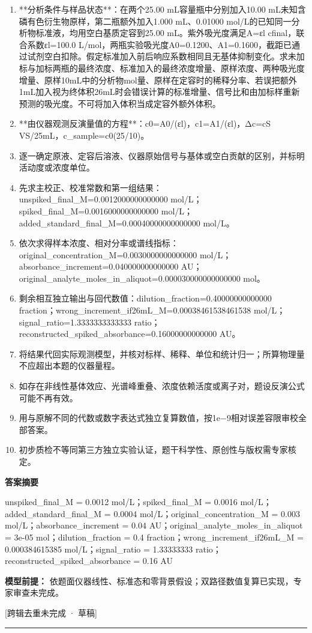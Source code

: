 \documentclass[UTF8,11pt,a4paper]{ctexart}
\begin{document}
\begin{enumerate}
\item **分析条件与样品状态**：在两个25.00 mL容量瓶中分别加入10.00 mL未知含磷有色衍生物原样，第二瓶额外加入1.000 mL、0.01000 mol/L的已知同一分析物标准液，均用空白基质定容到25.00 mL。紫外吸光度满足A=εl cfinal，联合系数εl=100.0 L/mol，两瓶实验吸光度A0=0.1200、A1=0.1600，截距已通过试剂空白扣除。假定标准加入前后响应系数相同且无基体抑制变化。求未加标与加标两瓶的最终浓度、标准加入的最终浓度增量、原样浓度、两种吸光度增量、原样10mL中的分析物mol量、原样在定容时的稀释分率、若误把额外1mL加入视为终体积26mL时会错误计算的标准增量、信号比和由加标样重新预测的吸光度。不可将加入体积当成定容外额外体积。
\item **由仪器观测反演量值的方程**：c0=A0/(εl)，c1=A1/(εl)，Δc=cS VS/25mL，c\_sample=c0(25/10)。
\item 逐一确定原液、定容后溶液、仪器原始信号与基体或空白贡献的区别，并标明活动度或浓度单位。
\item 先求主校正、校准常数和第一组结果：unspiked\_final\_M=0.0012000000000000 mol/L；spiked\_final\_M=0.0016000000000000 mol/L；added\_standard\_final\_M=0.00040000000000000 mol/L。
\item 依次求得样本浓度、相对分率或谱线指标：original\_concentration\_M=0.0030000000000000 mol/L；absorbance\_increment=0.040000000000000 AU；original\_analyte\_moles\_in\_aliquot=0.000030000000000000 mol。
\item 剩余相互独立输出与回代数值：dilution\_fraction=0.40000000000000 fraction；wrong\_increment\_if26mL\_M=0.00038461538461538 mol/L；signal\_ratio=1.3333333333333 ratio；reconstructed\_spiked\_absorbance=0.16000000000000 AU。
\item 将结果代回实际观测模型，并核对标样、稀释、单位和统计归一；所算物理量不应超出本题的仪器量程。
\item 如存在非线性基体效应、光谱峰重叠、浓度依赖活度或离子对，题设反演公式可能不再有效。
\item 用与原解不同的代数或数字表达式独立复算数值，按1e−9相对误差容限审校全部答案。
\item 初步质检不等同第三方独立实验认证，题干科学性、原创性与版权需专家核定。
\end{enumerate}
\noindent\textbf{答案摘要}\par
unspiked\_final\_M = 0.0012 mol/L；spiked\_final\_M = 0.0016 mol/L；added\_standard\_final\_M = 0.0004 mol/L；original\_concentration\_M = 0.003 mol/L；absorbance\_increment = 0.04 AU；original\_analyte\_moles\_in\_aliquot = 3e-05 mol；dilution\_fraction = 0.4 fraction；wrong\_increment\_if26mL\_M = 0.000384615385 mol/L；signal\_ratio = 1.33333333 ratio；reconstructed\_spiked\_absorbance = 0.16 AU\par
\noindent\textbf{模型前提：}
依题面仪器线性、标准态和零背景假设；双路径数值复算已实现，专家审查未完成。\par
\noindent\textcolor{red!65!black}{[跨辑去重未完成 · 草稿]} \par
\medskip\hrule\medskip
{}
\end{document}
